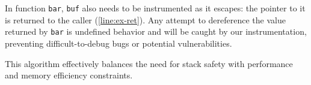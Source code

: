 In function \texttt{bar}, \texttt{buf} also needs to be instrumented as it escapes: the pointer to it is returned to the caller (\cref{line:ex-ret}).
Any attempt to dereference the value returned by \texttt{bar} is undefined behavior and will be caught by our instrumentation, preventing difficult-to-debug bugs or potential vulnerabilities.

\noindent
This algorithm effectively balances the need for stack safety with performance and memory efficiency constraints.

